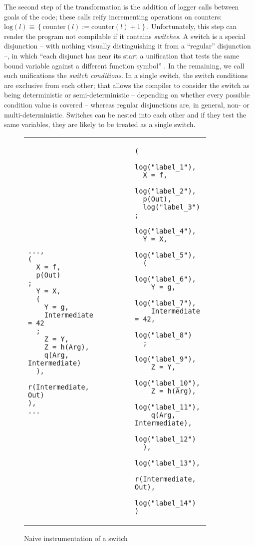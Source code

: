 \documentclass[british]{llncs}
\providecommand{\tabularnewline}{\\}
\begin{document}
The second step of the transformation is the addition of logger calls between goals of the code; these calls reify incrementing operations on counters: $\textrm{log}(l)\equiv\left\{ \textrm{counter}(l):=\textrm{counter}(l)+1\right\} $.
Unfortunately, this step can render the program not compilable if it
contains \emph{switches}. A switch is a special disjunction -- with nothing visually distinguishing it from a ``regular'' disjunction --, in which {}``each
disjunct has near its start a unification that tests the same bound
variable against a different function symbol'' \cite{Mercury:reference_manual}. In the remaining, we call such unifications the \emph{switch conditions}.
In a single switch, the switch conditions are exclusive from each other;
that allows the compiler to consider the switch as being deterministic or semi-deterministic -- depending on whether every possible
condition value is covered -- whereas regular disjunctions are, in general, non- or multi-deterministic. Switches can be nested into each other
and if they test the same variables, they are likely to be treated
as a single switch. 

\begin{figure}[th]
\begin{tabular}{>{\centering}p{0.4\linewidth}>{\centering}p{0.03\linewidth}|>{\centering}p{0.03\linewidth}>{\centering}p{0.4\linewidth}}
\begin{doublespace}

\begin{lstlisting}[basicstyle={\ttfamily},lineskip={-3pt},tabsize=4]
...,
(
  X = f,
  p(Out)
;
  Y = X,
  (
    Y = g,
    Intermediate = 42
  ;
    Z = Y,
    Z = h(Arg),
    q(Arg, Intermediate)
  ),
  r(Intermediate, Out)
),
...
\end{lstlisting}
\end{doublespace}
 & $\quad$ & $\quad$ & \begin{doublespace}

\begin{lstlisting}[basicstyle={\ttfamily},lineskip={-3pt},tabsize=4]
(
  log("label_1"),
  X = f,
  log("label_2"),
  p(Out),
  log("label_3")
;
  log("label_4"),
  Y = X,
  log("label_5"),
  (
    log("label_6"),
    Y = g,
    log("label_7"),
    Intermediate = 42,
    log("label_8")
  ;
    log("label_9"),
    Z = Y,
    log("label_10"),
    Z = h(Arg),
    log("label_11"),
    q(Arg, Intermediate),
    log("label_12")
  ),
  log("label_13"),
  r(Intermediate, Out),
  log("label_14")
)
\end{lstlisting}
\end{doublespace}
\tabularnewline
\end{tabular}

\caption{\label{fig:Instrumenting-a-switch}Naive instrumentation of a switch}

\end{figure}
\end{document}
